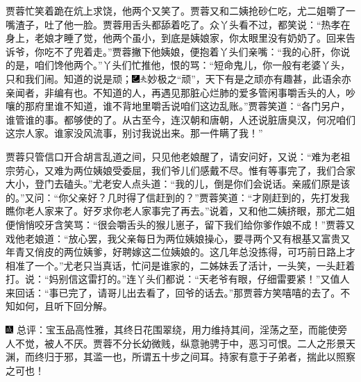 贾蓉忙笑着跪在炕上求饶，他两个又笑了。贾蓉又和二姨抢砂仁吃，尤二姐嚼了一嘴渣子，吐了他一脸。贾蓉用舌头都舔着吃了。众丫头看不过，都笑说：``热孝在身上，老娘才睡了觉，他两个虽小，到底是姨娘家，你太眼里没有奶奶了。回来告诉爷，你吃不了兜着走。''贾蓉撇下他姨娘，便抱着丫头们亲嘴：``我的心肝，你说的是，咱们馋他两个。''丫头们忙推他，恨的骂：``短命鬼儿，你一般有老婆丫头，只和我们闹。知道的说是顽；{\includegraphics[width=3mm]{../Images/00003}\includegraphics[width=3mm]{../Images/00012}\footnotesize \kaishu 妙极之``顽''，天下有是之顽亦有趣甚，此语余亦亲闻者，非编有也。}不知道的人，再遇见那脏心烂肺的爱多管闲事嚼舌头的人，吵嚷的那府里谁不知道，谁不背地里嚼舌说咱们这边乱账。''贾蓉笑道：``各门另户，谁管谁的事。都够使的了。从古至今，连汉朝和唐朝，人还说脏唐臭汉，何况咱们这宗人家。谁家没风流事，别讨我说出来。那一件瞒了我！''

贾蓉只管信口开合胡言乱道之间，只见他老娘醒了，请安问好，又说：``难为老祖宗劳心，又难为两位姨娘受委屈，我们爷儿们感戴不尽。惟有等事完了，我们合家大小，登门去磕头。''尤老安人点头道：``我的儿，倒是你们会说话。亲戚们原是该的。''又问：``你父亲好？几时得了信赶到的？''贾蓉笑道：``才刚赶到的，先打发我瞧你老人家来了。好歹求你老人家事完了再去。''说着，又和他二姨挤眼，那尤二姐便悄悄咬牙含笑骂：``很会嚼舌头的猴儿崽子，留下我们给你爹作娘不成！''贾蓉又戏他老娘道：``放心罢，我父亲每日为两位姨娘操心，要寻两个又有根基又富贵又年青又俏皮的两位姨爹，好聘嫁这二位姨娘的。这几年总没拣得，可巧前日路上才相准了一个。''尤老只当真话，忙问是谁家的，二姊妹丢了活计，一头笑，一头赶着打。说：``妈别信这雷打的。''连丫头们都说：``天老爷有眼，仔细雷要紧！''又值人来回话：``事已完了，请哥儿出去看了，回爷的话去。''那贾蓉方笑嘻嘻的去了。不知如何，且听下回分解。

{\includegraphics[width=3mm]{../Images/00005} \kaishu 总评：宝玉品高性雅，其终日花围翠绕，用力维持其间，淫荡之至，而能使旁人不觉，被人不厌。贾蓉不分长幼微贱，纵意驰骋于中，恶习可恨。二人之形景天渊，而终归于邪，其滥一也，所谓五十步之间耳。持家有意于子弟者，揣此以照察之可也！}

